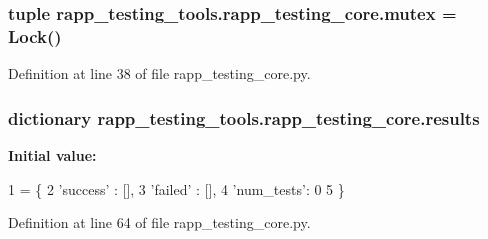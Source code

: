 \hypertarget{namespacerapp__testing__tools_1_1rapp__testing__core_a6aa893ae5a52f7ce64f27bc2f9063bc1}{
\subsubsection[{mutex}]{\setlength{\rightskip}{0pt plus 5cm}tuple rapp\-\_\-testing\-\_\-tools.\-rapp\-\_\-testing\-\_\-core.\-mutex = Lock()}}\label{namespacerapp__testing__tools_1_1rapp__testing__core_a6aa893ae5a52f7ce64f27bc2f9063bc1}


Definition at line 38 of file rapp\-\_\-testing\-\_\-core.\-py.

\hypertarget{namespacerapp__testing__tools_1_1rapp__testing__core_a36485787b1d8c1e042c32a84b18fdc35}{
\subsubsection[{results}]{\setlength{\rightskip}{0pt plus 5cm}dictionary rapp\-\_\-testing\-\_\-tools.\-rapp\-\_\-testing\-\_\-core.\-results}}\label{namespacerapp__testing__tools_1_1rapp__testing__core_a36485787b1d8c1e042c32a84b18fdc35}
{\bfseries Initial value\-:}
\begin{DoxyCode}
1 = \{
2     \textcolor{stringliteral}{'success'} : [],
3     \textcolor{stringliteral}{'failed'} : [],
4     \textcolor{stringliteral}{'num\_tests'}: 0
5 \}
\end{DoxyCode}


Definition at line 64 of file rapp\-\_\-testing\-\_\-core.\-py.

